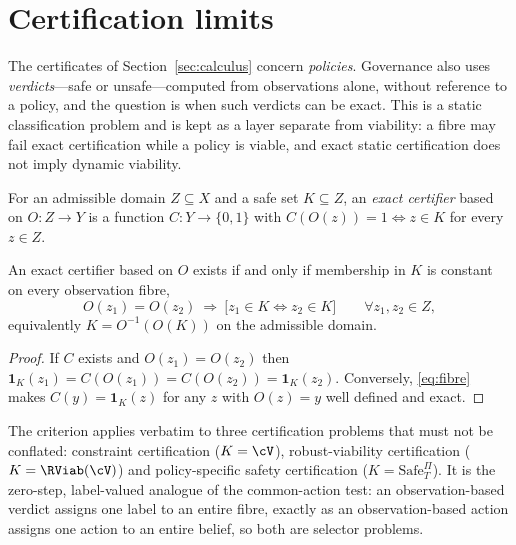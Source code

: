 \section{Certification limits}\label{sec:certification}

The certificates of Section~\ref{sec:calculus} concern \emph{policies}. Governance also uses \emph{verdicts}---safe or unsafe---computed from observations alone, without reference to a policy, and the question is when such verdicts can be exact. This is a static classification problem and is kept as a layer separate from viability: a fibre may fail exact certification while a policy is viable, and exact static certification does not imply dynamic viability.

\begin{definition}\label{def:certifier}
For an admissible domain $Z\subseteq X$ and a safe set $K\subseteq Z$, an \emph{exact certifier} based on $O:Z\to Y$ is a function $C:Y\to\{0,1\}$ with $C(O(z))=1\iff z\in K$ for every $z\in Z$.
\end{definition}

\begin{proposition}\label{prop:fibre}
An exact certifier based on $O$ exists if and only if membership in $K$ is constant on every observation fibre,
\begin{equation}\label{eq:fibre}
O(z_1)=O(z_2)\ \Longrightarrow\ \bigl[z_1\in K\iff z_2\in K\bigr]\qquad\forall z_1,z_2\in Z,
\end{equation}
equivalently $K=O^{-1}(O(K))$ on the admissible domain.
\end{proposition}

\begin{proof}
If $C$ exists and $O(z_1)=O(z_2)$ then $\mathbf 1_K(z_1)=C(O(z_1))=C(O(z_2))=\mathbf 1_K(z_2)$. Conversely, \eqref{eq:fibre} makes $C(y)=\mathbf 1_K(z)$ for any $z$ with $O(z)=y$ well defined and exact.
\end{proof}

The criterion applies verbatim to three certification problems that must not be conflated: constraint certification ($K=\cV$), robust-viability certification ($K=\RViab(\cV)$) and policy-specific safety certification ($K=\mathrm{Safe}^\Pi_T$). It is the zero-step, label-valued analogue of the common-action test: an observation-based verdict assigns one label to an entire fibre, exactly as an observation-based action assigns one action to an entire belief, so both are selector problems.


